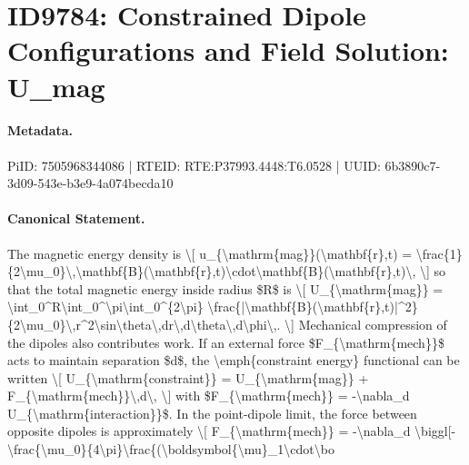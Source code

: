 \section*{ID9784: Constrained Dipole Configurations and Field Solution: U\_mag}
\paragraph{Metadata.}
PiID: 7505968344086 | RTEID: RTE:P37993.4448:T6.0528 | UUID: 6b3890c7-3d09-543e-b3e9-4a074becda10

\paragraph{Canonical Statement.}
The magnetic energy density is \textbackslash{}[ u\_\{\textbackslash{}mathrm\{mag\}\}(\textbackslash{}mathbf\{r\},t) = \textbackslash{}frac\{1\}\{2\textbackslash{}mu\_0\}\textbackslash{},\textbackslash{}mathbf\{B\}(\textbackslash{}mathbf\{r\},t)\textbackslash{}cdot\textbackslash{}mathbf\{B\}(\textbackslash{}mathbf\{r\},t)\textbackslash{}, \textbackslash{}] so that the total magnetic energy inside radius \$R\$ is \textbackslash{}[ U\_\{\textbackslash{}mathrm\{mag\}\} = \textbackslash{}int\_0\textasciicircum{}R\textbackslash{}int\_0\textasciicircum{}\textbackslash{}pi\textbackslash{}int\_0\textasciicircum{}\{2\textbackslash{}pi\} \textbackslash{}frac\{|\textbackslash{}mathbf\{B\}(\textbackslash{}mathbf\{r\},t)|\textasciicircum{}2\}\{2\textbackslash{}mu\_0\}\textbackslash{},r\textasciicircum{}2\textbackslash{}sin\textbackslash{}theta\textbackslash{},dr\textbackslash{},d\textbackslash{}theta\textbackslash{},d\textbackslash{}phi\textbackslash{},. \textbackslash{}] Mechanical compression of the dipoles also contributes work. If an external force \$F\_\{\textbackslash{}mathrm\{mech\}\}\$ acts to maintain separation \$d\$, the \textbackslash{}emph\{constraint energy\} functional can be written \textbackslash{}[ U\_\{\textbackslash{}mathrm\{constraint\}\} = U\_\{\textbackslash{}mathrm\{mag\}\} + F\_\{\textbackslash{}mathrm\{mech\}\}\textbackslash{},d\textbackslash{}, \textbackslash{}] with \$F\_\{\textbackslash{}mathrm\{mech\}\} = -\textbackslash{}nabla\_d U\_\{\textbackslash{}mathrm\{interaction\}\}\$. In the point-dipole limit, the force between opposite dipoles is approximately \textbackslash{}[ F\_\{\textbackslash{}mathrm\{mech\}\} = -\textbackslash{}nabla\_d \textbackslash{}biggl[-\textbackslash{}frac\{\textbackslash{}mu\_0\}\{4\textbackslash{}pi\}\textbackslash{}frac\{(\textbackslash{}boldsymbol\{\textbackslash{}mu\}\_1\textbackslash{}cdot\textbackslash{}bo

